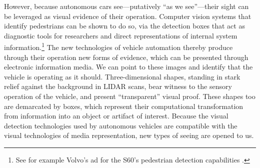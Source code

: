 

However, because autonomous cars see---putatively ``as we see''---their sight can
be leveraged as visual evidence of their operation. Computer vision
systems that identify 
pedestrians can be shown to do so, via the detection boxes that act as
diagnostic tools for researchers and direct representations of
internal system information.\footnote{See for example Volvo's ad for
  the S60's pedestrian detection capabilities \cite{volvovideo}.} The new technologies of vehicle
automation thereby produce through 
their operation new forms of evidence, which can be presented through
electronic information media. We can point to these images and identify
that the vehicle is operating as it should. Three-dimensional shapes,
standing in stark relief against 
the background in LIDAR scans, bear witness to the sensory operation
of the vehicle, and present ``transparent'' visual proof.
These shapes too are demarcated by boxes, which represent their
computational transformation from information into an object or
artifact of interest. Because the visual detection technologies used
by autonomous vehicles are compatible with the visual technologies of
media representation, new types of seeing are opened to us.


